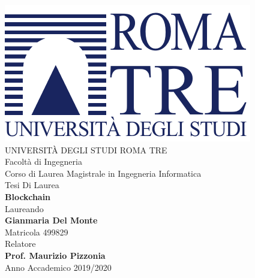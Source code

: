 \thispagestyle{empty}
\begin{center}
	\vspace{10mm}
	{\includegraphics[width=0.4 \linewidth]{img/uniroma3-logo}} \\
	\vspace{10mm}
	{\Large UNIVERSIT\`A DEGLI STUDI ROMA TRE} \\
	\vspace{5mm}
	{\Large Facolt\`a di Ingegneria} \\
	{\Large Corso di Laurea Magistrale in Ingegneria Informatica} \\
	\vspace{15mm}
	{\Large Tesi Di Laurea} \\
	\vspace{15mm}
	{\Large \textbf{Blockchain}} \\
	\vspace{15mm}
	{\large Laureando \\ \textbf{Gianmaria Del Monte} \\ Matricola 499829} \\
	\vspace{7mm}
	{\large Relatore \\ \textbf{Prof. Maurizio Pizzonia}} \\
	\vfill
	{\large Anno Accademico 2019/2020} \\
\end{center}
\newpage